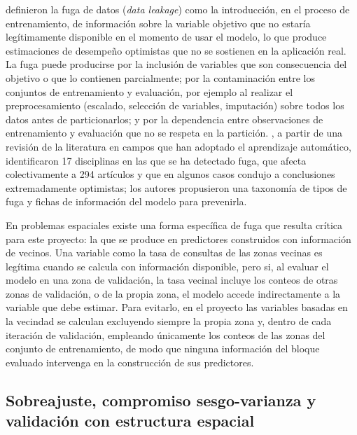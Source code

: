 \textcite{kaufman2012} definieron la fuga de datos (\textit{data leakage}) como la
introducción, en el proceso de entrenamiento, de información sobre la variable objetivo que
no estaría legítimamente disponible en el momento de usar el modelo, lo que produce
estimaciones de desempeño optimistas que no se sostienen en la aplicación real. La fuga
puede producirse por la inclusión de variables que son consecuencia del objetivo o que lo
contienen parcialmente; por la contaminación entre los conjuntos de entrenamiento y
evaluación, por ejemplo al realizar el preprocesamiento (escalado, selección de variables,
imputación) sobre todos los datos antes de particionarlos; y por la dependencia entre
observaciones de entrenamiento y evaluación que no se respeta en la partición.
\textcite{kapoor2023}, a partir de una revisión de la literatura en campos que han adoptado
el aprendizaje automático, identificaron 17 disciplinas en las que se ha detectado fuga, que
afecta colectivamente a 294 artículos y que en algunos casos condujo a conclusiones
extremadamente optimistas; los autores propusieron una taxonomía de tipos de fuga y fichas
de información del modelo para prevenirla.

En problemas espaciales existe una forma específica de fuga que resulta crítica para este
proyecto: la que se produce en predictores construidos con información de vecinos. Una
variable como la tasa de consultas de las zonas vecinas es legítima cuando se calcula con
información disponible, pero si, al evaluar el modelo en una zona de validación, la tasa
vecinal incluye los conteos de otras zonas de validación, o de la propia zona, el modelo
accede indirectamente a la variable que debe estimar. Para evitarlo, en el proyecto las
variables basadas en la vecindad se calculan excluyendo siempre la propia zona y, dentro de
cada iteración de validación, empleando únicamente los conteos de las zonas del conjunto de
entrenamiento, de modo que ninguna información del bloque evaluado intervenga en la
construcción de sus predictores.

\subsection{Sobreajuste, compromiso sesgo-varianza y validación con estructura espacial}
\label{subsec:validacion-espacial}

